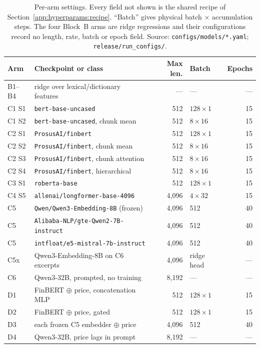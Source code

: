 \begin{table}[htbp]
  \centering
  \caption[Per-arm settings that vary across the fixed recipe]{Per-arm settings.
    Every field not shown is the shared recipe of
    Section~\ref{app:hyperparams:recipe}. ``Batch'' gives physical batch
    $\times$ accumulation steps. The four Block~B arms are ridge regressions and
    their configurations record no length, rate, batch or epoch field.
    Source: \texttt{configs/models/*.yaml}; \texttt{release/run\_configs/}.}
  \label{tab:app-settings}
  \footnotesize
  \setlength{\tabcolsep}{4pt}
  \begin{tabular}{@{}llrlr@{}}
    \toprule
    Arm & Checkpoint or class & Max len. & Batch & Epochs \\
    \midrule
    B1--B4 & ridge over lexical/dictionary features & --- & --- & --- \\
    \midrule
    C1 S1 & \texttt{bert-base-uncased} & 512 & $128\times1$ & 15 \\
    C1 S2 & \texttt{bert-base-uncased}, chunk mean & 512 & $8\times16$ & 15 \\
    C2 S1 & \texttt{ProsusAI/finbert} & 512 & $128\times1$ & 15 \\
    C2 S2 & \texttt{ProsusAI/finbert}, chunk mean & 512 & $8\times16$ & 15 \\
    C2 S3 & \texttt{ProsusAI/finbert}, chunk attention & 512 & $8\times16$ & 15 \\
    C2 S4 & \texttt{ProsusAI/finbert}, hierarchical & 512 & $8\times16$ & 15 \\
    C3 S1 & \texttt{roberta-base} & 512 & $128\times1$ & 15 \\
    C4 S5 & \texttt{allenai/longformer-base-4096} & 4{,}096 & $4\times32$ & 15 \\
    C5 & \texttt{Qwen/Qwen3-Embedding-8B} (frozen) & 4{,}096 & 512 & 40 \\
    C5 & \texttt{Alibaba-NLP/gte-Qwen2-7B-instruct} & 4{,}096 & 512 & 40 \\
    C5 & \texttt{intfloat/e5-mistral-7b-instruct} & 4{,}096 & 512 & 40 \\
    C5x & Qwen3-Embedding-8B on C6 excerpts & 4{,}096 & ridge head & --- \\
    C6 & Qwen3-32B, prompted, no training & 8{,}192 & --- & --- \\
    \midrule
    D1 & FinBERT $\oplus$ price, concatenation MLP & 512 & $128\times1$ & 15 \\
    D2 & FinBERT $\oplus$ price, gated & 512 & $128\times1$ & 15 \\
    D3 & each frozen C5 embedder $\oplus$ price & 4{,}096 & 512 & 40 \\
    D4 & Qwen3-32B, price lags in prompt & 8{,}192 & --- & --- \\
    \bottomrule
  \end{tabular}
\end{table}


